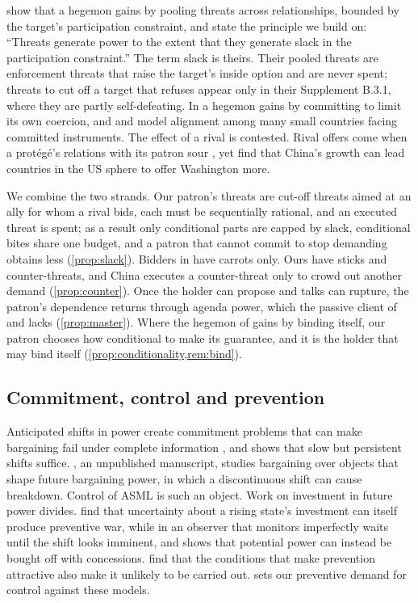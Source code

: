\citet{clayton2026framework} show that a hegemon gains by pooling threats across relationships, bounded by the target's participation constraint, and \citet{clayton2026putting} state the principle we build on: ``Threats generate power to the extent that they generate slack in the participation constraint.'' The term slack is theirs. Their pooled threats are enforcement threats that raise the target's inside option and are never spent; threats to cut off a target that refuses appear only in their Supplement B.3.1, where they are partly self-defeating. In \citet{clayton2026theory} a hegemon gains by committing to limit its own coercion, and \citet{broner2025hegemonic} and \citet{becko2025optimal} model alignment among many small countries facing committed instruments. The effect of a rival is contested. Rival offers come when a protégé's relations with its patron sour \citep{yang2026major}, yet \citet{camboni2025spheres} find that China's growth can lead countries in the US sphere to offer Washington more.

We combine the two strands. Our patron's threats are cut-off threats aimed at an ally for whom a rival bids, each must be sequentially rational, and an executed threat is spent; as a result only conditional parts are capped by slack, conditional bites share one budget, and a patron that cannot commit to stop demanding obtains less (\cref{prop:slack}). Bidders in \citet{bueno2016competition} have carrots only. Ours have sticks and counter-threats, and China executes a counter-threat only to crowd out another demand (\cref{prop:counter}). Once the holder can propose and talks can rupture, the patron's dependence returns through agenda power, which the passive client of \citet{groseclose1996buying} and \citet{dekel2008vote} lacks (\cref{prop:master}). Where the hegemon of \citet{clayton2026theory} gains by binding itself, our patron chooses how conditional to make its guarantee, and it is the holder that may bind itself (\cref{prop:conditionality,rem:bind}).

\subsection{Commitment, control and prevention}

Anticipated shifts in power create commitment problems that can make bargaining fail under complete information \citep{fearon1995rationalist, powell2006war}, and \citet{krainin2017preventive} shows that slow but persistent shifts suffice. \citet{fearon1996bargaining}, an unpublished manuscript, studies bargaining over objects that shape future bargaining power, in which a discontinuous shift can cause breakdown. Control of ASML is such an object. Work on investment in future power divides. \citet{debs2014known} find that uncertainty about a rising state's investment can itself produce preventive war, while in \citet{bas2016dynamic} an observer that monitors imperfectly waits until the shift looks imminent, and \citet{spaniel2019bargaining} shows that potential power can instead be bought off with concessions. \citet{benson2023commitment} find that the conditions that make prevention attractive also make it unlikely to be carried out.  sets our preventive demand for control against these models.

